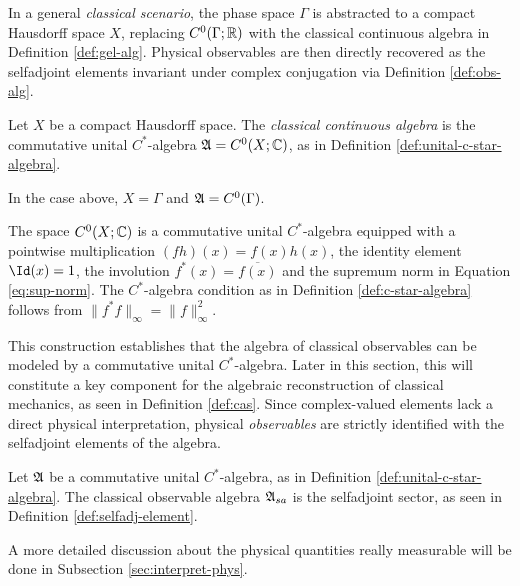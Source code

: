 	In a general \emph{classical scenario}, the phase space $\Gamma$ is abstracted to a compact Hausdorff space $X$, replacing $C^0(\Gamma; \mathbb{R})$ with the classical continuous algebra in Definition \ref{def:gel-alg}. Physical observables are then directly recovered as the selfadjoint elements invariant under complex conjugation via Definition \ref{def:obs-alg}.
	
	\begin{definition}\label{def:gel-alg}
		Let $X$ be a compact Hausdorff space. The \emph{classical continuous algebra} is the commutative unital $C^*$-algebra $\mathfrak{A} = C^0(X; \mathbb{C})$, as in Definition \ref{def:unital-c-star-algebra}.
	\end{definition}
	
	\noindent In the case above, $X=\Gamma$ and $\mathfrak{A} = C^0(\Gamma)$.
	
	\begin{remark}
		The space $C^0(X; \mathbb{C})$ is a commutative unital $C^*$-algebra equipped with a pointwise multiplication $(fh)(x)=f(x)h(x)$, the identity element $\Id(x)=1$, the involution $f^*(x)=\overline{f(x)}$ and the supremum norm in Equation \eqref{eq:sup-norm}. The $C^*$-algebra condition as in Definition \ref{def:c-star-algebra} follows from $\|f^*f\|_\infty = \|f\|_\infty^2$.
	\end{remark}
	
	This construction establishes that the algebra of classical observables can be modeled by a commutative unital $C^*$-algebra. Later in this section, this will constitute a key component for the algebraic reconstruction of classical mechanics, as seen in Definition \ref{def:cas}. Since complex-valued elements lack a direct physical interpretation, physical \emph{observables} are strictly identified with the selfadjoint elements of the algebra.
	
	\begin{definition}\label{def:obs-alg}
		Let $\mathfrak{A}$ be a commutative unital $C^*$-algebra, as in Definition \ref{def:unital-c-star-algebra}. The classical observable algebra $\mathfrak{A}_{sa}$ is the selfadjoint sector, as seen in Definition \ref{def:selfadj-element}.
	\end{definition}
	
	\noindent A more detailed discussion about the physical quantities really measurable will be done in Subsection \ref{sec:interpret-phys}.
	
	\medskip
